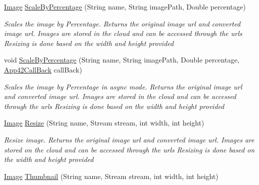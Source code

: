 \begin{DoxyCompactItemize}
\hyperlink{classcom_1_1shephertz_1_1app42_1_1paas_1_1sdk_1_1csharp_1_1image_processor_1_1_image}{Image} \hyperlink{classcom_1_1shephertz_1_1app42_1_1paas_1_1sdk_1_1csharp_1_1image_processor_1_1_image_processor_service_a918dac7c8e039dd04aa043e4f557d59d}{Scale\+By\+Percentage} (String name, String image\+Path, Double percentage)
\begin{DoxyCompactList}\small\item\em Scales the image by Percentage. Returns the original image url and converted image url. Images are stored in the cloud and can be accessed through the urls Resizing is done based on the width and height provided \end{DoxyCompactList}\item 
void \hyperlink{classcom_1_1shephertz_1_1app42_1_1paas_1_1sdk_1_1csharp_1_1image_processor_1_1_image_processor_service_aeaee8682d4d1c1398a583114d02a3406}{Scale\+By\+Percentage} (String name, String image\+Path, Double percentage, \hyperlink{interfacecom_1_1shephertz_1_1app42_1_1paas_1_1sdk_1_1csharp_1_1_app42_call_back}{App42\+Call\+Back} call\+Back)
\begin{DoxyCompactList}\small\item\em Scales the image by Percentage in async mode. Returns the original image url and converted image url. Images are stored in the cloud and can be accessed through the urls Resizing is done based on the width and height provided \end{DoxyCompactList}\item 
\hyperlink{classcom_1_1shephertz_1_1app42_1_1paas_1_1sdk_1_1csharp_1_1image_processor_1_1_image}{Image} \hyperlink{classcom_1_1shephertz_1_1app42_1_1paas_1_1sdk_1_1csharp_1_1image_processor_1_1_image_processor_service_a93269ae2779fbf1e8c01b377a14f8e74}{Resize} (String name, Stream stream, int width, int height)
\begin{DoxyCompactList}\small\item\em Resize image. Returns the original image url and converted image url. Images are stored on the cloud and can be accessed through the urls Resizing is done based on the width and height provided \end{DoxyCompactList}\item 
\hyperlink{classcom_1_1shephertz_1_1app42_1_1paas_1_1sdk_1_1csharp_1_1image_processor_1_1_image}{Image} \hyperlink{classcom_1_1shephertz_1_1app42_1_1paas_1_1sdk_1_1csharp_1_1image_processor_1_1_image_processor_service_ad4d841058049f8325f3320acdb56a88b}{Thumbnail} (String name, Stream stream, int width, int height)

\end{DoxyCompactItemize}
